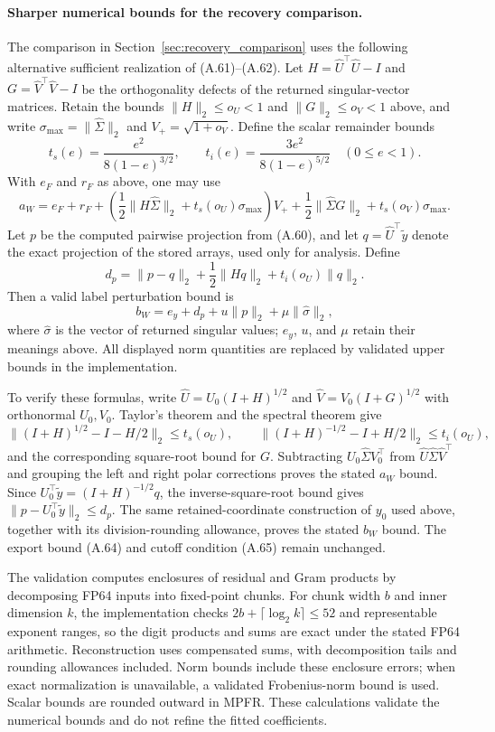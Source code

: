 \paragraph{Sharper numerical bounds for the recovery comparison.}
The comparison in Section~\ref{sec:recovery_comparison} uses the following
alternative sufficient realization of (A.61)--(A.62). Let
$H=\widehat U^\top\widehat U-I$ and
$G=\widehat V^\top\widehat V-I$ be the orthogonality defects of the
returned singular-vector matrices. Retain the bounds
$\|H\|_2\le o_U<1$ and $\|G\|_2\le o_V<1$ above, and write
$\sigma_{\max}=\|\widehat\Sigma\|_2$ and $V_+=\sqrt{1+o_V}$.
Define the scalar remainder bounds
\[
 t_s(e)=\frac{e^2}{8(1-e)^{3/2}},\qquad
 t_i(e)=\frac{3e^2}{8(1-e)^{5/2}}\quad(0\le e<1).
\]
With $e_F$ and $r_F$ as above, one may use
\[
 a_W=e_F+r_F+
 \left(\frac12\|H\widehat\Sigma\|_2+
       t_s(o_U)\sigma_{\max}\right)V_+
 +\frac12\|\widehat\Sigma G\|_2+t_s(o_V)\sigma_{\max}.
\]
Let $p$ be the computed pairwise projection from (A.60), and let
$q=\widehat U^\top\widetilde y$ denote the exact projection of the stored
arrays, used only for analysis. Define
\[
 d_p=\|p-q\|_2+\frac12\|Hq\|_2+t_i(o_U)\|q\|_2.
\]
Then a valid label perturbation bound is
\[
 b_W=e_y+d_p+u\|p\|_2+\mu\|\widehat\sigma\|_2,
\]
where $\widehat\sigma$ is the vector of returned singular values;
$e_y$, $u$, and $\mu$ retain their meanings above. All displayed norm
quantities are replaced by validated upper bounds in the implementation.

To verify these formulas, write
$\widehat U=U_0(I+H)^{1/2}$ and
$\widehat V=V_0(I+G)^{1/2}$ with orthonormal $U_0,V_0$.
Taylor's theorem and the spectral theorem give
\[
 \|(I+H)^{1/2}-I-H/2\|_2\le t_s(o_U),\qquad
 \|(I+H)^{-1/2}-I+H/2\|_2\le t_i(o_U),
\]
and the corresponding square-root bound for $G$.
Subtracting $U_0\widehat\Sigma V_0^\top$ from
$\widehat U\widehat\Sigma\widehat V^\top$ and grouping the left and
right polar corrections proves the stated $a_W$ bound. Since
$U_0^\top\widetilde y=(I+H)^{-1/2}q$, the inverse-square-root bound gives
$\|p-U_0^\top\widetilde y\|_2\le d_p$. The same retained-coordinate
construction of $y_0$ used above, together with its division-rounding
allowance, proves the stated $b_W$ bound. The export bound (A.64) and
cutoff condition (A.65) remain unchanged.

The validation computes enclosures of residual and Gram products by
decomposing FP64 inputs into fixed-point chunks. For chunk width $b$ and
inner dimension $k$, the implementation checks
$2b+\lceil\log_2 k\rceil\le52$ and representable exponent ranges,
so the digit products and sums are exact under the stated FP64 arithmetic.
Reconstruction uses compensated sums, with decomposition tails and
rounding allowances included. Norm bounds include these enclosure errors;
when exact normalization is unavailable, a validated Frobenius-norm bound
is used. Scalar bounds are rounded outward in MPFR. These calculations
validate the numerical bounds and do not refine the fitted coefficients.
